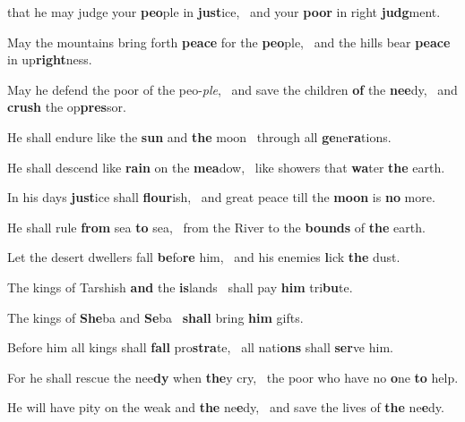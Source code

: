 \item that he may judge your \textbf{peo}ple in \textbf{just}ice,~\mediant
 and your \textbf{poor} in right \textbf{judg}ment.

\item May the mountains bring forth \textbf{peace} for the \textbf{peo}ple,~\mediant
 and the hills bear \textbf{peace} in up\textbf{right}ness.

\item May he defend the poor of the peo-\emph{ple},~\flex
 and save the children \textbf{of} the \textbf{nee}dy,~\mediant
 and \textbf{crush} the op\textbf{pres}sor.

\item He shall endure like the \textbf{sun} and \textbf{the} moon~\mediant
 through all \textbf{ge}ne\textbf{ra}tions.

\item He shall descend like \textbf{rain} on the \textbf{mea}dow,~\mediant
 like showers that \textbf{wa}ter \textbf{the} earth.

\item In his days \textbf{just}ice shall \textbf{flour}ish,~\mediant
 and great peace till the \textbf{moon} is \textbf{no} more.

\item He shall rule \textbf{from} sea \textbf{to} sea,~\mediant
 from the River to the \textbf{bounds} of \textbf{the} earth.

\item Let the desert dwellers fall \textbf{be}fo\textbf{re} him,~\mediant
 and his enemies \textbf{l}ick \textbf{the} dust.

\item The kings of Tarshish \textbf{and} the \textbf{is}lands~\mediant
 shall pay \textbf{him} tri\textbf{bu}te.

\item The kings of \textbf{She}ba and \textbf{Se}ba~\mediant
 \textbf{shall} bring \textbf{him} gifts.

\item Before him all kings shall \textbf{fall} pro\textbf{stra}te,~\mediant
 all nati\textbf{ons} shall \textbf{ser}ve him.

\item For he shall rescue the nee\textbf{dy} when \textbf{the}y cry,~\mediant
 the poor who have no \textbf{o}ne \textbf{to} help.

\item He will have pity on the weak and \textbf{the} ne\textbf{e}dy,~\mediant
 and save the lives of \textbf{the} ne\textbf{e}dy.

